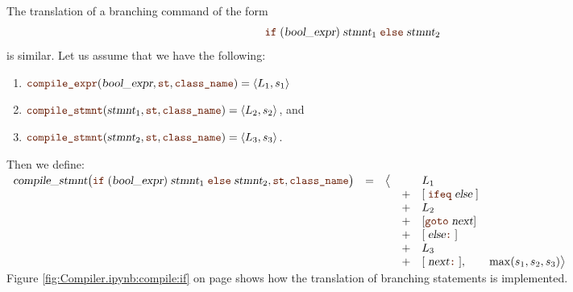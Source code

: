 The translation of a branching command of the form
\[ \mytt{if}\; (\textsl{bool\_expr})\; \textsl{stmnt}_1\; \mytt{else}\; \textsl{stmnt}_2 \]
is similar.  Let us assume that we have the following:
\begin{enumerate}
\item $\mytt{compile\_expr}(\textsl{bool\_expr}, \mytt{st}, \mytt{class\_name}) = \pair(L_1, s_1)$
\item $\mytt{compile\_stmnt}(\textsl{stmnt}_1, \mytt{st}, \mytt{class\_name}) = \pair(L_2, s_2)$, and
\item $\mytt{compile\_stmnt}(\textsl{stmnt}_2, \mytt{st}, \mytt{class\_name}) = \pair(L_3, s_3)$.
\end{enumerate}
Then we define:
\\[0.2cm]
\hspace*{0.3cm}
$
   \begin{array}[t]{lcccl}
   \textsl{compile\_stmnt}\bigl(\mytt{if}\; (\textsl{bool\_expr})\;\textsl{stmnt}_1\;\mytt{else}\;\textsl{stmnt}_2, \mytt{st}, \mytt{class\_name}\bigr) & = & \bigl\langle & & L_1  \\
   &&& + & [\;\mytt{ifeq}\;\textsl{else}\;] \\
   &&& + & L_2 \\
   &&& + & [\mytt{goto}\;\textsl{next}] \\
   &&& + & [\;\textsl{else}\mytt{:}\;] \\
   &&& + & L_3 \\
   &&& + & [\;\textsl{next}\mytt{:}\;], \qquad \max(s_1, s_2, s_3) \bigr\rangle        
\end{array}
$
\\[0.2cm]
Figure \ref{fig:Compiler.ipynb:compile:if} on page \pageref{fig:Compiler.ipynb:compile:if} shows how the
translation of branching statements is implemented.

